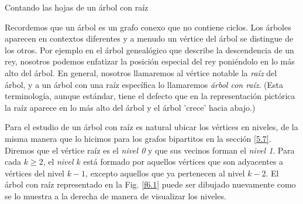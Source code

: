 \documentclass[11pt,spanish,makeidx]{amsbook}
\theoremstyle{definition}
\theoremstyle{remark}
\begin{document}
\begin{section}{Contando las hojas de un árbol con raíz}
\label{6.1}

Recordemos que un {árbol} es un grafo conexo que no contiene ciclos. Los árboles aparecen en contextos diferentes y a menudo un vértice del árbol se distingue de los otros. Por ejemplo en el árbol genealógico que describe la descendencia de un rey, nosotros podemos enfatizar la posición especial del rey poniéndolo en lo más alto del árbol. En general, nosotros llamaremos al vértice notable la {\em raíz} del árbol, y a un árbol con una raíz  específica lo llamaremos {\em árbol con raíz}. (Esta  terminología, aunque estándar, tiene el defecto que en la representación pictórica la raíz aparece en lo más alto del árbol y el árbol 'crece' hacia abajo.)

Para el estudio de un árbol con raíz es natural ubicar los vértices en niveles, de la misma manera que lo hicimos para los grafos bipartitos en la sección \ref{5.7}. Diremos que el vértice raíz es el {\it nivel 0} y que sus vecinos forman el {\it nivel 1}. Para cada $k\ge 2$, el {\it nivel $k$} está formado por aquellos vértices que son adyacentes a vértices del nivel $k-1$, excepto aquellos que ya pertenecen al nivel $k-2$. El árbol con raíz representado en la Fig. \ref{f6.1} puede ser dibujado nuevamente como se lo muestra a la derecha de manera de visualizar los niveles.  


\end{section}
\end{document}
